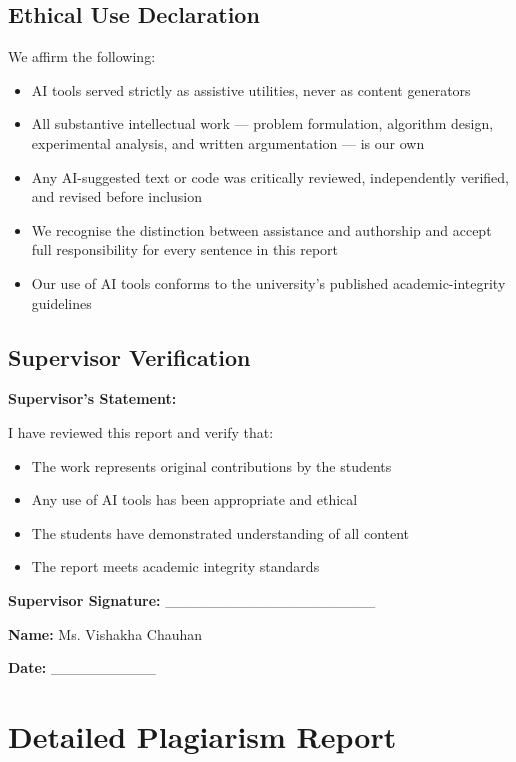 \subsection{Ethical Use Declaration}

We affirm the following:

\begin{itemize}
    \item AI tools served strictly as assistive utilities, never as content generators
    \item All substantive intellectual work — problem formulation, algorithm design, experimental analysis, and written argumentation — is our own
    \item Any AI-suggested text or code was critically reviewed, independently verified, and revised before inclusion
    \item We recognise the distinction between assistance and authorship and accept full responsibility for every sentence in this report
    \item Our use of AI tools conforms to the university's published academic-integrity guidelines
\end{itemize}

\subsection{Supervisor Verification}

\textbf{Supervisor's Statement:}

I have reviewed this report and verify that:
\begin{itemize}
    \item The work represents original contributions by the students
    \item Any use of AI tools has been appropriate and ethical
    \item The students have demonstrated understanding of all content
    \item The report meets academic integrity standards
\end{itemize}

\vspace{1cm}

\textbf{Supervisor Signature:} \_\_\_\_\_\_\_\_\_\_\_\_\_\_\_\_\_\_\_\_

\textbf{Name:} Ms. Vishakha Chauhan

\textbf{Date:} \_\_\_\_\_\_\_\_\_\_

\newpage

\section{Detailed Plagiarism Report}

